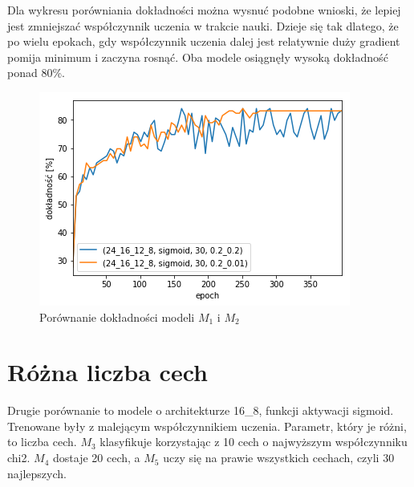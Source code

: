 \documentclass{report}
\begin{document}
    Dla wykresu porówniania dokładności można wysnuć podobne wnioski, że lepiej jest zmniejszać współczynnik uczenia w trakcie nauki.
    Dzieje się tak dlatego, że po wielu epokach, gdy współczynnik uczenia dalej jest relatywnie duży gradient pomija minimum i zaczyna rosnąć.
    Oba modele osiągnęły wysoką dokładność ponad 80\%.

    \begin{figure}[htp]
        \centering
        \includegraphics[scale=0.8]{././img/lr-accuracy.png}
        \caption{Porównanie dokładności modeli $M_1$ i $M_2$}
    \end{figure}

    \section{Różna liczba cech}\label{sec:różnaLiczbaCech}

    Drugie porównanie to modele o architekturze 16\_8, funkcji aktywacji sigmoid.
    Trenowane były z malejącym współczynnikiem uczenia.
    Parametr, który je różni, to liczba cech.
    $M_3$ klasyfikuje korzystając z 10 cech o najwyższym współczynniku chi2.
    $M_4$ dostaje 20 cech, a $M_5$ uczy się na prawie wszystkich cechach, czyli 30 najlepszych.
\end{document}
